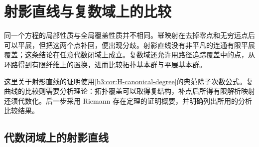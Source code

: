 
\section{射影直线与复数域上的比较}
\label{b3:sec:I03}

同一个方程的局部性质与全局覆盖性质并不相同。幂映射在去掉零点和无穷远点后可以平展，但把这两个点补回，便出现分歧。射影直线没有非平凡的连通有限平展覆盖；这条结论在任意代数闭域上成立。复数域还允许用路径追踪覆盖中的点，从环路得到有限纤维上的置换，进而比较拓扑基本群与平展基本群。

\ProseParagraphBreak
这里关于射影直线的证明使用\cref{b3:cor:H-canonical-degree}的典范除子次数公式。复曲线的比较则需要分析理论：拓扑覆盖可以取得复结构，补点后所得有限解析映射还须代数化。后一步采用 Riemann 存在定理的证明概要，并明确列出所用的分析比较结果。

\subsection{代数闭域上的射影直线}
\label{b3:subsec:I03:01}

